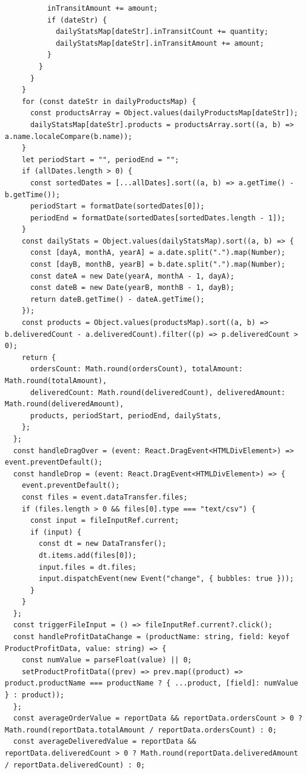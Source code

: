 \begin{code}
\begin{verbatim}
          inTransitAmount += amount;
          if (dateStr) {
            dailyStatsMap[dateStr].inTransitCount += quantity;
            dailyStatsMap[dateStr].inTransitAmount += amount;
          }
        }
      }
    }
    for (const dateStr in dailyProductsMap) {
      const productsArray = Object.values(dailyProductsMap[dateStr]);
      dailyStatsMap[dateStr].products = productsArray.sort((a, b) => a.name.localeCompare(b.name));
    }
    let periodStart = "", periodEnd = "";
    if (allDates.length > 0) {
      const sortedDates = [...allDates].sort((a, b) => a.getTime() - b.getTime());
      periodStart = formatDate(sortedDates[0]);
      periodEnd = formatDate(sortedDates[sortedDates.length - 1]);
    }
    const dailyStats = Object.values(dailyStatsMap).sort((a, b) => {
      const [dayA, monthA, yearA] = a.date.split(".").map(Number);
      const [dayB, monthB, yearB] = b.date.split(".").map(Number);
      const dateA = new Date(yearA, monthA - 1, dayA);
      const dateB = new Date(yearB, monthB - 1, dayB);
      return dateB.getTime() - dateA.getTime();
    });
    const products = Object.values(productsMap).sort((a, b) => b.deliveredCount - a.deliveredCount).filter((p) => p.deliveredCount > 0);
    return {
      ordersCount: Math.round(ordersCount), totalAmount: Math.round(totalAmount),
      deliveredCount: Math.round(deliveredCount), deliveredAmount: Math.round(deliveredAmount),
      products, periodStart, periodEnd, dailyStats,
    };
  };
  const handleDragOver = (event: React.DragEvent<HTMLDivElement>) => event.preventDefault();
  const handleDrop = (event: React.DragEvent<HTMLDivElement>) => {
    event.preventDefault();
    const files = event.dataTransfer.files;
    if (files.length > 0 && files[0].type === "text/csv") {
      const input = fileInputRef.current;
      if (input) {
        const dt = new DataTransfer();
        dt.items.add(files[0]);
        input.files = dt.files;
        input.dispatchEvent(new Event("change", { bubbles: true }));
      }
    }
  };
  const triggerFileInput = () => fileInputRef.current?.click();
  const handleProfitDataChange = (productName: string, field: keyof ProductProfitData, value: string) => {
    const numValue = parseFloat(value) || 0;
    setProductProfitData((prev) => prev.map((product) => product.productName === productName ? { ...product, [field]: numValue } : product));
  };
  const averageOrderValue = reportData && reportData.ordersCount > 0 ? Math.round(reportData.totalAmount / reportData.ordersCount) : 0;
  const averageDeliveredValue = reportData && reportData.deliveredCount > 0 ? Math.round(reportData.deliveredAmount / reportData.deliveredCount) : 0;

\end{verbatim}
\end{code}
